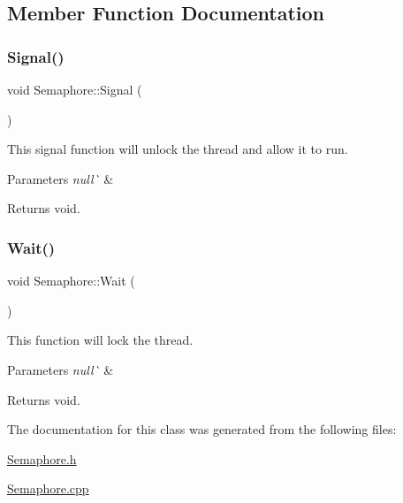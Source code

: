 \subsection{Member Function Documentation}
\mbox{\label{class_semaphore_a86f92f738b4486439b296d8e235895f2}} 
\subsubsection{\texorpdfstring{Signal()}{Signal()}}
{\footnotesize\ttfamily void Semaphore\+::\+Signal (\begin{DoxyParamCaption}{ }\end{DoxyParamCaption})}



This signal function will unlock the thread and allow it to run. 


\begin{DoxyParams}{Parameters}
{\em null\`{}} & \\
\hline
\end{DoxyParams}
\begin{DoxyReturn}{Returns}
void. 
\end{DoxyReturn}
\mbox{\label{class_semaphore_a72aabebf026e3a8b1f3e4d0fa8ee1eda}} 
\subsubsection{\texorpdfstring{Wait()}{Wait()}}
{\footnotesize\ttfamily void Semaphore\+::\+Wait (\begin{DoxyParamCaption}{ }\end{DoxyParamCaption})}



This function will lock the thread. 


\begin{DoxyParams}{Parameters}
{\em null\`{}} & \\
\hline
\end{DoxyParams}
\begin{DoxyReturn}{Returns}
void. 
\end{DoxyReturn}


The documentation for this class was generated from the following files\+:\begin{DoxyCompactItemize}
\item 
\mbox{\hyperlink{_semaphore_8h}{Semaphore.\+h}}\item 
\mbox{\hyperlink{_semaphore_8cpp}{Semaphore.\+cpp}}\end{DoxyCompactItemize}
